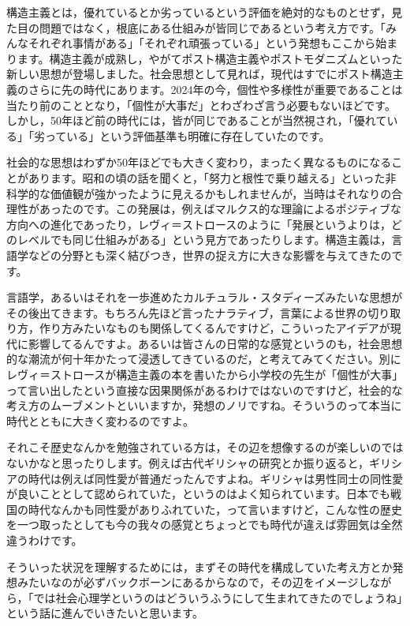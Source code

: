 \documentclass{ltjsbook}
\begin{document}
構造主義とは，優れているとか劣っているという評価を絶対的なものとせず，見た目の問題ではなく，根底にある仕組みが皆同じであるという考え方です。「みんなそれぞれ事情がある」「それぞれ頑張っている」という発想もここから始まります。構造主義が成熟し，やがてポスト構造主義やポストモダニズムといった新しい思想が登場しました。社会思想として見れば，現代はすでにポスト構造主義のさらに先の時代にあります。2024年の今，個性や多様性が重要であることは当たり前のこととなり，「個性が大事だ」とわざわざ言う必要もないほどです。しかし，50年ほど前の時代には，皆が同じであることが当然視され，「優れている」「劣っている」という評価基準も明確に存在していたのです。

社会的な思想はわずか50年ほどでも大きく変わり，まったく異なるものになることがあります。昭和の頃の話を聞くと，「努力と根性で乗り越える」といった非科学的な価値観が強かったように見えるかもしれませんが，当時はそれなりの合理性があったのです。この発展は，例えばマルクス的な理論によるポジティブな方向への進化であったり，レヴィ＝ストロースのように「発展というよりは，どのレベルでも同じ仕組みがある」という見方であったりします。構造主義は，言語学などの分野とも深く結びつき，世界の捉え方に大きな影響を与えてきたのです。

言語学，あるいはそれを一歩進めたカルチュラル・スタディーズみたいな思想がその後出てきます。もちろん先ほど言ったナラティブ，言葉による世界の切り取り方，作り方みたいなものも関係してくるんですけど，こういったアイデアが現代に影響してるんですよ。あるいは皆さんの日常的な感覚というのも，社会思想的な潮流が何十年かたって浸透してきているのだ，と考えてみてください。別にレヴィ＝ストロースが構造主義の本を書いたから小学校の先生が「個性が大事」って言い出したという直接な因果関係があるわけではないのですけど，社会的な考え方のムーブメントといいますか，発想のノリですね。そういうのって本当に時代とともに大きく変わるのですよ。

それこそ歴史なんかを勉強されている方は，その辺を想像するのが楽しいのではないかなと思ったりします。例えば古代ギリシャの研究とか振り返ると，ギリシアの時代は例えば同性愛が普通だったんですよね。ギリシャは男性同士の同性愛が良いこととして認められていた，というのはよく知られています。日本でも戦国の時代なんかも同性愛がありふれていた，って言いますけど，こんな性の歴史を一つ取ったとしても今の我々の感覚とちょっとでも時代が違えば雰囲気は全然違うわけです。

そういった状況を理解するためには，まずその時代を構成していた考え方とか発想みたいなのが必ずバックボーンにあるからなので，その辺をイメージしながら，「では社会心理学というのはどういうふうにして生まれてきたのでしょうね」という話に進んでいきたいと思います。
\end{document}
